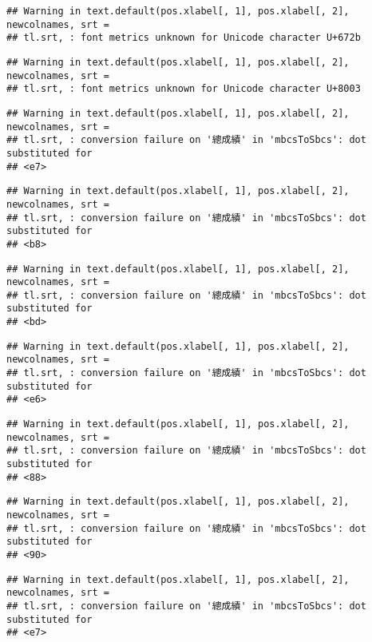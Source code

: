 \documentclass[
]{book}
\begin{document}
\begin{verbatim}
## Warning in text.default(pos.xlabel[, 1], pos.xlabel[, 2], newcolnames, srt =
## tl.srt, : font metrics unknown for Unicode character U+672b
\end{verbatim}

\begin{verbatim}
## Warning in text.default(pos.xlabel[, 1], pos.xlabel[, 2], newcolnames, srt =
## tl.srt, : font metrics unknown for Unicode character U+8003
\end{verbatim}

\begin{verbatim}
## Warning in text.default(pos.xlabel[, 1], pos.xlabel[, 2], newcolnames, srt =
## tl.srt, : conversion failure on '總成績' in 'mbcsToSbcs': dot substituted for
## <e7>
\end{verbatim}

\begin{verbatim}
## Warning in text.default(pos.xlabel[, 1], pos.xlabel[, 2], newcolnames, srt =
## tl.srt, : conversion failure on '總成績' in 'mbcsToSbcs': dot substituted for
## <b8>
\end{verbatim}

\begin{verbatim}
## Warning in text.default(pos.xlabel[, 1], pos.xlabel[, 2], newcolnames, srt =
## tl.srt, : conversion failure on '總成績' in 'mbcsToSbcs': dot substituted for
## <bd>
\end{verbatim}

\begin{verbatim}
## Warning in text.default(pos.xlabel[, 1], pos.xlabel[, 2], newcolnames, srt =
## tl.srt, : conversion failure on '總成績' in 'mbcsToSbcs': dot substituted for
## <e6>
\end{verbatim}

\begin{verbatim}
## Warning in text.default(pos.xlabel[, 1], pos.xlabel[, 2], newcolnames, srt =
## tl.srt, : conversion failure on '總成績' in 'mbcsToSbcs': dot substituted for
## <88>
\end{verbatim}

\begin{verbatim}
## Warning in text.default(pos.xlabel[, 1], pos.xlabel[, 2], newcolnames, srt =
## tl.srt, : conversion failure on '總成績' in 'mbcsToSbcs': dot substituted for
## <90>
\end{verbatim}

\begin{verbatim}
## Warning in text.default(pos.xlabel[, 1], pos.xlabel[, 2], newcolnames, srt =
## tl.srt, : conversion failure on '總成績' in 'mbcsToSbcs': dot substituted for
## <e7>
\end{verbatim}
\end{document}
